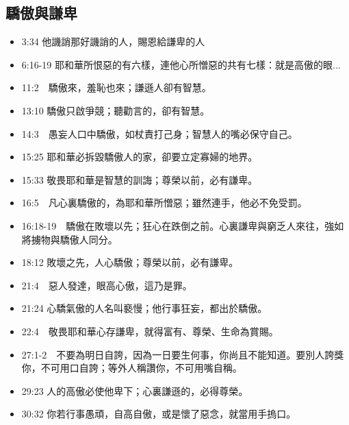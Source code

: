 \subsection{驕傲與謙卑}
\begin{itemize}
\itemsep-.45em 
\item 3:34 他譏誚那好譏誚的人，賜恩給謙卑的人
\item 6:16-19 耶和華所恨惡的有六樣，連他心所憎惡的共有七樣：就是高傲的眼...
\item 11:2　驕傲來，羞恥也來；謙遜人卻有智慧。
\item 13:10 驕傲只啟爭競；聽勸言的，卻有智慧。
\item 14:3　愚妄人口中驕傲，如杖責打己身；智慧人的嘴必保守自己。
\item 15:25 耶和華必拆毀驕傲人的家，卻要立定寡婦的地界。
\item 15:33 敬畏耶和華是智慧的訓誨；尊榮以前，必有謙卑。
\item 16:5　凡心裏驕傲的，為耶和華所憎惡；雖然連手，他必不免受罰。
\item 16:18-19　驕傲在敗壞以先；狂心在跌倒之前。心裏謙卑與窮乏人來往，強如將擄物與驕傲人同分。
\item 18:12 敗壞之先，人心驕傲；尊榮以前，必有謙卑。
\item 21:4　惡人發達，眼高心傲，這乃是罪。
\item 21:24 心驕氣傲的人名叫褻慢；他行事狂妄，都出於驕傲。
\item 22:4　敬畏耶和華心存謙卑，就得富有、尊榮、生命為賞賜。
\item 27:1-2　不要為明日自誇，因為一日要生何事，你尚且不能知道。要別人誇獎你，不可用口自誇；等外人稱讚你，不可用嘴自稱。
\item 29:23 人的高傲必使他卑下；心裏謙遜的，必得尊榮。
\item 30:32 你若行事愚頑，自高自傲，或是懷了惡念，就當用手摀口。
\end{itemize}


